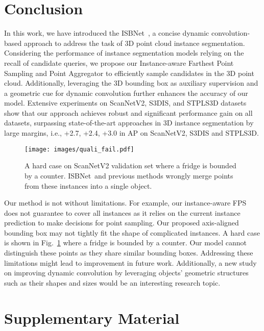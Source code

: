 \documentclass[10pt,twocolumn,letterpaper]{article}
\def\Approach{ISBNet}
\begin{document}
\section{Conclusion}
\label{sec:conclusion}
In this work, we have introduced the \Approach~, a concise dynamic convolution-based approach to address the task of 3D point cloud instance segmentation. Considering the performance of instance segmentation models relying on the recall of candidate queries, we propose our Instance-aware Farthest Point Sampling and Point Aggregator to efficiently sample candidates in the 3D point cloud. Additionally, leveraging the 3D bounding box as auxiliary supervision and a geometric cue for dynamic convolution further enhances the accuracy of our model. Extensive experiments on ScanNetV2, S3DIS, and STPLS3D datasets show that our approach achieves robust and significant performance gain on all datasets, surpassing state-of-the-art approaches in 3D instance segmentation by large margins, i.e., +2.7, +2.4, +3.0 in AP on ScanNetV2, S3DIS and STPLS3D. 

\begin{figure}[t]
  \centering
  \texttt{[image: images/quali\_fail.pdf]}
\vspace{-18pt}
   \caption{A hard case on ScanNetV2 validation set where a fridge is bounded by a counter. \Approach~and previous methods wrongly merge points from these instances into a single object.}
\vspace{-14pt}
   \label{fig:quali_fail}
\end{figure}

Our method is not without limitations. For example, our instance-aware FPS does not guarantee to cover all instances as it relies on the current instance prediction to make decisions for point sampling. Our proposed axis-aligned bounding box may not tightly fit the shape of complicated instances. A hard case is shown in Fig.~\ref{fig:quali_fail} where a fridge is bounded by a counter. Our model cannot distinguish these points as they share similar bounding boxes. Addressing these limitations might lead to improvement in future work. Additionally, a new study on improving dynamic convolution by leveraging objects' geometric structures such as their shapes and sizes would be an interesting research topic.


{\small


}
    
\newpage

\section{Supplementary Material}
\end{document}
